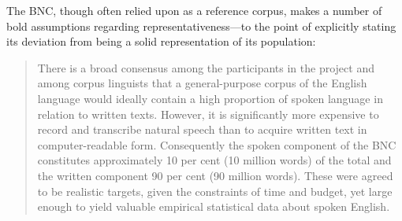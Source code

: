 


% 
% 
% 


The BNC, though often relied upon as a reference corpus, makes a number of bold assumptions regarding representativeness---to the point of explicitly stating its deviation from being a solid representation of its population:

\begin{quote}
There is a broad consensus among the participants in the project and among corpus linguists that a general-purpose corpus of the English language would ideally contain a high proportion of spoken language in relation to written texts. However, it is significantly more expensive to record and transcribe natural speech than to acquire written text in computer-readable form. Consequently the spoken component of the BNC constitutes approximately 10 per cent (10 million words) of the total and the written component 90 per cent (90 million words). These were agreed to be realistic targets, given the constraints of time and budget, yet large enough to yield valuable empirical statistical data about spoken English.
\end{quote}

